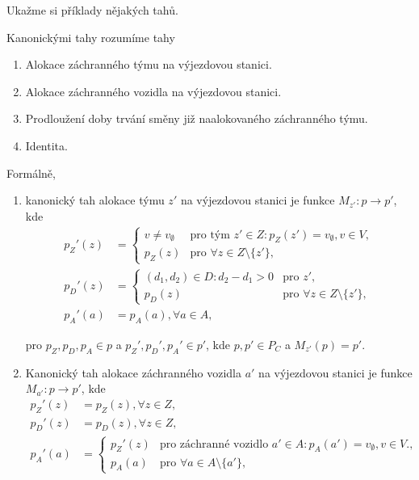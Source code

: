 Ukažme si příklady nějakých tahů.

\begin{definice}
  Kanonickými tahy rozumíme tahy
  \begin{enumerate}
    \item
      Alokace záchranného týmu na výjezdovou stanici.

    \item
      Alokace záchranného vozidla na výjezdovou stanici.

    \item
      Prodloužení doby trvání směny již naalokovaného záchranného týmu. 

    \item
      Identita.
  \end{enumerate}

  Formálně,
  \begin{enumerate}
    \item
      kanonický tah alokace týmu $z'$ na výjezdovou stanici je funkce $M_{z'} : p \rightarrow p'$, kde
      \begin{align*}
        p_Z'(z) &=
          \begin{cases}
            v \neq v_{\emptyset} & \text{pro tým $z' \in Z \colon p_Z(z') = v_{\emptyset}, v \in V$}, \\
            p_Z(z) & \text{pro $\forall z \in Z \setminus \{ z' \}$},
          \end{cases}
          \\
        p_D'(z) &=
          \begin{cases}
            (d_1, d_2) \in D \colon d_2 - d_1 > 0 & \text{pro $z'$}, \\
            p_D(z) & \text{pro $\forall z \in Z \setminus \{ z' \}$},
          \end{cases}
          \\
        p_A'(a) &= p_A(a), \forall a \in A,
      \end{align*}

      pro $p_Z, p_D, p_A \in p$ a $p_Z', p_D', p_A' \in p'$, kde $p, p' \in P_C$ a $M_{z'}(p) = p'$.

    \item
      Kanonický tah alokace záchranného vozidla $a'$ na výjezdovou stanici je funkce $M_{a'} : p \rightarrow p'$, kde
      \begin{align*}
        p_Z'(z) &= p_Z(z), \forall z \in Z,
        \\
        p_D'(z) &= p_D(z), \forall z \in Z,
        \\
        p_A'(a) &=
        \begin{cases}
          p_Z'(z) & \text{pro záchranné vozidlo $a' \in A \colon p_A(a') = v_{\emptyset}, v \in V$.}, \\
          p_A(a) & \text{pro $\forall a \in A \setminus \{ a' \}$},
        \end{cases}
      \end{align*}


\end{enumerate}
\end{definice}
